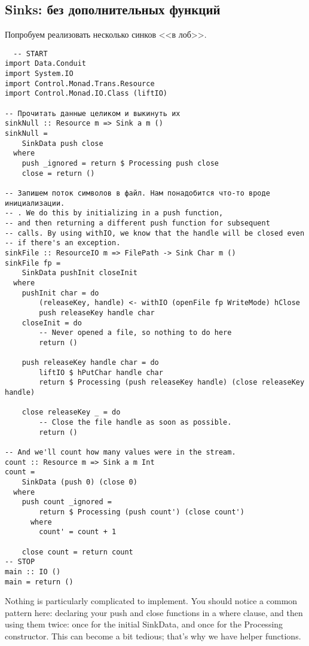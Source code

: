 \subsection{Sinks: без дополнительных функций}
Попробуем реализовать несколько синков <<в лоб>>.
\begin{lstlisting}
  -- START
import Data.Conduit
import System.IO
import Control.Monad.Trans.Resource
import Control.Monad.IO.Class (liftIO)

-- Прочитать данные целиком и выкинуть их
sinkNull :: Resource m => Sink a m ()
sinkNull =
    SinkData push close
  where
    push _ignored = return $ Processing push close
    close = return ()

-- Запишем поток символов в файл. Нам понадобится что-то вроде инициализации.
-- . We do this by initializing in a push function,
-- and then returning a different push function for subsequent
-- calls. By using withIO, we know that the handle will be closed even
-- if there's an exception.
sinkFile :: ResourceIO m => FilePath -> Sink Char m ()
sinkFile fp =
    SinkData pushInit closeInit
  where
    pushInit char = do
        (releaseKey, handle) <- withIO (openFile fp WriteMode) hClose
        push releaseKey handle char
    closeInit = do
        -- Never opened a file, so nothing to do here
        return ()

    push releaseKey handle char = do
        liftIO $ hPutChar handle char
        return $ Processing (push releaseKey handle) (close releaseKey handle)

    close releaseKey _ = do
        -- Close the file handle as soon as possible.
        return ()

-- And we'll count how many values were in the stream.
count :: Resource m => Sink a m Int
count =
    SinkData (push 0) (close 0)
  where
    push count _ignored =
        return $ Processing (push count') (close count')
      where
        count' = count + 1

    close count = return count
-- STOP
main :: IO ()
main = return ()
\end{lstlisting}
Nothing is particularly complicated to implement. You should notice a common pattern
here:
declaring your push and close functions in a where clause, and then
using them twice: once for the initial SinkData, and once for the
Processing constructor. This can become a bit tedious; that's why
we have helper functions.

